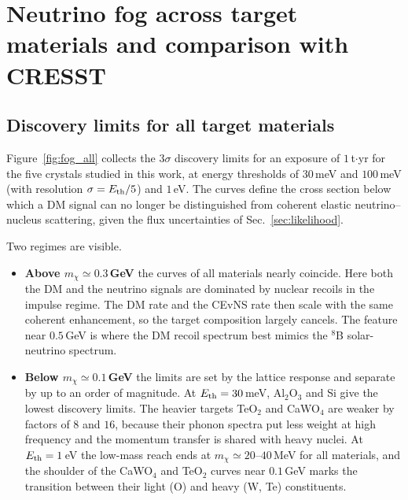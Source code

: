 
\section{Neutrino fog across target materials and comparison with CRESST}
\label{sec:fog_cresst}

\subsection{Discovery limits for all target materials}

Figure~\ref{fig:fog_all} collects the $3\sigma$ discovery limits for an exposure of
$1$\,t$\cdot$yr for the five crystals studied in this work, at energy thresholds of
$30$\,meV and $100$\,meV (with resolution $\sigma = E_{\rm th}/5$) and $1$\,eV. The
curves define the cross section below which a DM signal can no longer be distinguished
from coherent elastic neutrino--nucleus scattering, given the flux uncertainties of
Sec.~\ref{sec:likelihood}.

Two regimes are visible.
\begin{itemize}
  \item \textbf{Above $m_\chi \simeq 0.3$\,GeV} the curves of all materials nearly
  coincide. Here both the DM and the neutrino signals are dominated by nuclear recoils
  in the impulse regime. The DM rate and the CEvNS rate then scale with the same
  coherent enhancement, so the target composition largely cancels. The feature near
  $0.5$\,GeV is where the DM recoil spectrum best mimics the $^8$B solar-neutrino
  spectrum.
  \item \textbf{Below $m_\chi \simeq 0.1$\,GeV} the limits are set by the lattice
  response and separate by up to an order of magnitude. At $E_{\rm th}=30$\,meV,
  Al$_2$O$_3$ and Si give the lowest discovery limits. The heavier targets TeO$_2$ and
  CaWO$_4$ are weaker by factors of $8$ and $16$, because their phonon spectra put less
  weight at high frequency and the momentum transfer is shared with heavy nuclei. At
  $E_{\rm th}=1$\,eV the low-mass reach ends at $m_\chi \simeq 20$--$40$\,MeV for all
  materials, and the shoulder of the CaWO$_4$ and TeO$_2$ curves near $0.1$\,GeV marks
  the transition between their light (O) and heavy (W, Te) constituents.
\end{itemize}

